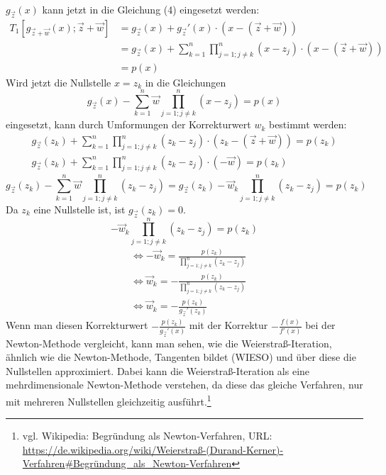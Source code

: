 \documentclass[12pt]{article}
\begin{document}
$g_{\vec{z}}(x)$ kann jetzt in die Gleichung (4) eingesetzt werden:
\begin{align*}
    T_1[g_{\vec{z} + \vec{w}}(x);\vec{z} + \vec{w}] &= g_{\vec{z}}(x)+g_{\vec{z}}'(x)\cdot (x-(\vec{z}+\vec{w})) \\
                                                    &= g_{\vec{z}}(x)+\sum_{k=1}^{n}\prod_{j=1;j\neq k}^{n}(x-z_j)\cdot (x-(\vec{z}+\vec{w})) \\
                                                    &= p(x)
\end{align*}
Wird jetzt die Nullstelle $x=z_k$ in die Gleichungen
\begin{equation}
    g_{\vec{z}}(x)-\sum_{k=1}^{n}\vec{w}\prod_{j=1;j\neq k}^{n}(x-z_j) = p(x)
\end{equation}
eingesetzt, kann durch Umformungen der Korrekturwert $w_k$ bestimmt werden:
\begin{align*}
    g_{\vec{z}}(z_k)+\sum_{k=1}^{n}\prod_{j=1;j\neq k}^{n}(z_k-z_j)\cdot (z_k-(\vec{z}+\vec{w})) = p(z_k) \\
    g_{\vec{z}}(z_k)+\sum_{k=1}^{n}\prod_{j=1;j\neq k}^{n}(z_k-z_j)\cdot (-\vec{w}) = p(z_k)
\end{align*}
\begin{equation*}
    g_{\vec{z}}(z_k)-\sum_{k=1}^{n}\vec{w}\prod_{j=1;j\neq k}^{n}(z_k-z_j) = g_{\vec{z}}(z_k)-\vec{w}_k\prod_{j=1;j\neq k}^{n}(z_k-z_j) = p(z_k)
\end{equation*}
Da $z_k$ eine Nullstelle ist, ist $g_{\vec{z}}(z_k) = 0$.
\begin{equation*}
    -\vec{w}_k\prod_{j=1;j\neq k}^{n}(z_k-z_j) = p(z_k)
\end{equation*}
\begin{align*}
    &\Leftrightarrow -\vec{w}_k = \frac{p(z_k)}{\prod_{j=1;j\neq k}^{n}(z_k-z_j)} \\
    &\Leftrightarrow \vec{w}_k = -\frac{p(z_k)}{\prod_{j=1;j\neq k}^{n}(z_k-z_j)} \\
    &\Leftrightarrow \vec{w}_k = -\frac{p(z_k)}{g_{\vec{z}}'(z_k)}
\end{align*}
Wenn man diesen Korrekturwert $-\frac{p(z_k)}{g_{\vec{z}}'(x)}$ mit der Korrektur $-\frac{f(x)}{f'(x)}$ bei der Newton-Methode vergleicht, kann man sehen, wie die Weierstraß-Iteration, ähnlich wie die Newton-Methode, Tangenten bildet (WIESO) und über diese die Nullstellen approximiert. Dabei kann die Weierstraß-Iteration als eine mehrdimensionale Newton-Methode verstehen, da diese das gleiche Verfahren, nur mit mehreren Nullstellen gleichzeitig ausführt.\footnote{vgl. Wikipedia: Begründung als Newton-Verfahren, URL: \url{https://de.wikipedia.org/wiki/Weierstraß-(Durand-Kerner)-Verfahren#Begründung_als_Newton-Verfahren}}
\end{document}
